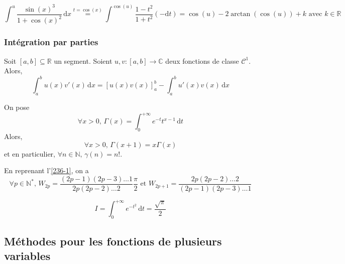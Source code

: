 	\begin{example}
		\[ \int^u \frac{\sin(x)^3}{1+\cos(x)^2} \, \mathrm{d}x \overset{t = \cos(x)}{=} \int^{\cos(u)} \frac{1-t^2}{1+t^2} (-\mathrm{d}t) = \cos(u) - 2\arctan(\cos(u)) + k \text{ avec } k \in \mathbb{R} \]
	\end{example}
	
	\subsubsection{Intégration par parties}
	
	
	\begin{theorem}
		Soit $[a,b] \subseteq \mathbb{R}$ un segment. Soient $u, v : [a,b] \rightarrow \mathbb{C}$ deux fonctions de classe $\mathcal{C}^1$. Alors,
		\[ \int_a^b u(x)v'(x) \, \mathrm{d}x = \left[ u(x) v(x) \right]_a^b - \int_a^b u'(x) v(x) \, \mathrm{d}x \]
	\end{theorem}
	
	
	\begin{example}
		\label{236-2}
		On pose
		\[ \forall x > 0, \, \Gamma(x) = \int_0^{+\infty} e^{-t} t^{x-1} \, \mathrm{d}t \]
		Alors,
		\[ \forall x > 0, \, \Gamma(x+1) = x \Gamma(x) \]
		et en particulier, $\forall n \in \mathbb{N}, \, \gamma(n) = n!$.
	\end{example}
	
	
	\begin{example}
		En reprenant l'\cref{236-1}, on a
		\[ \forall p \in \mathbb{N}^*, \, W_{2p} = \frac{(2p-1)(2p-3) \dots 1}{2p (2p-2) \dots 2} \frac{\pi}{2} \text{ et } W_{2p+1} = \frac{2p (2p-2) \dots 2}{(2p-1)(2p-3) \dots 1} \]
	\end{example}
	
	
	\begin{application}
		\[ I = \int_0^{+\infty} e^{-t^2} \, \mathrm{d}t = \frac{\sqrt{\pi}}{2} \]
	\end{application}
	
	\subsection{Méthodes pour les fonctions de plusieurs variables}
	
